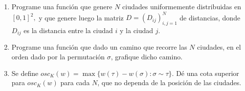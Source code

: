 \begin{enumerate}
	\item Programe una función que genere $N$ ciudades uniformemente distribuidas en $[0,1]^{2},$ y que genere luego la matriz $D=(D_{ij})_{i,j=1}^{N}$ de distancias, donde $D_{ij}$ es la distancia entre
	la ciudad $i$ y la ciudad $j$. %
	
	\item Programe una función que dado un camino que recorre las $N$ ciudades, en el orden dado por la permutación $\sigma$, grafique dicho camino.
	
	
	
	\item Se define $osc_{K}(w)=\max \{w(\tau)-w(\sigma) : \sigma \sim \tau \}$. Dé una cota superior para $osc_{K}(w)$ para cada $N$, que no dependa de la posición de las ciudades.
	

\end{enumerate}
